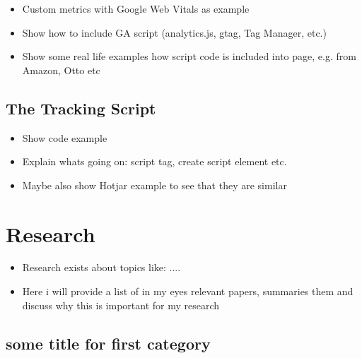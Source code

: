 \begin{itemize}
    \item Custom metrics with Google Web Vitals as example
    \item Show how to include GA script (analytics.js, gtag, Tag Manager, etc.)
    \item Show some real life examples how script code is included into page, e.g. from Amazon, Otto etc
\end{itemize}



\subsection{The Tracking Script}

\begin{itemize}
\item Show code example
\item Explain whats going on: script tag, create script element etc.
\item Maybe also show Hotjar example to see that they are similar
\end{itemize}
















\section{Research}


\begin{itemize}
\item Research exists about topics like: ....
\item Here i will provide a list of in my eyes relevant papers, summaries them and discuss why this is important for my research
\end{itemize}



\subsection{some title for first category}

